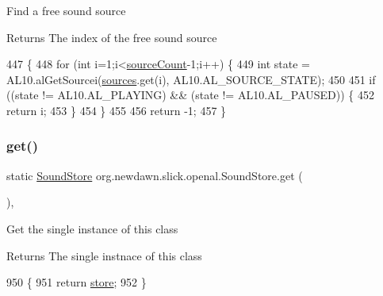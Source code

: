 Find a free sound source

\begin{DoxyReturn}{Returns}
The index of the free sound source 
\end{DoxyReturn}

\begin{DoxyCode}
447                                  \{
448         \textcolor{keywordflow}{for} (\textcolor{keywordtype}{int} i=1;i<\mbox{\hyperlink{classorg_1_1newdawn_1_1slick_1_1openal_1_1_sound_store_ad1c2294ac984e23e608068a85aba4b69}{sourceCount}}-1;i++) \{
449             \textcolor{keywordtype}{int} state = AL10.alGetSourcei(\mbox{\hyperlink{classorg_1_1newdawn_1_1slick_1_1openal_1_1_sound_store_a3a2ffa73acd847102bb30140129c440b}{sources}}.get(i), AL10.AL\_SOURCE\_STATE);
450             
451             \textcolor{keywordflow}{if} ((state != AL10.AL\_PLAYING) && (state != AL10.AL\_PAUSED)) \{
452                 \textcolor{keywordflow}{return} i;
453             \}
454         \}
455         
456         \textcolor{keywordflow}{return} -1;
457     \}
\end{DoxyCode}
\mbox{\label{classorg_1_1newdawn_1_1slick_1_1openal_1_1_sound_store_a826b5faeb77b23d9d93cb47824a8c854}} 
\subsubsection{\texorpdfstring{get()}{get()}}
{\footnotesize\ttfamily static \mbox{\hyperlink{classorg_1_1newdawn_1_1slick_1_1openal_1_1_sound_store}{Sound\+Store}} org.\+newdawn.\+slick.\+openal.\+Sound\+Store.\+get (\begin{DoxyParamCaption}{ }\end{DoxyParamCaption})\hspace{0.3cm}{\ttfamily [inline]}, {\ttfamily [static]}}

Get the single instance of this class

\begin{DoxyReturn}{Returns}
The single instnace of this class 
\end{DoxyReturn}

\begin{DoxyCode}
950                                    \{
951         \textcolor{keywordflow}{return} \mbox{\hyperlink{classorg_1_1newdawn_1_1slick_1_1openal_1_1_sound_store_ac83a0d0311e4d9018f032c8774ea4120}{store}};
952     \}
\end{DoxyCode}
\mbox{\label{classorg_1_1newdawn_1_1slick_1_1openal_1_1_sound_store_a1184883b7fdecc6504664956545dfad7}} 
